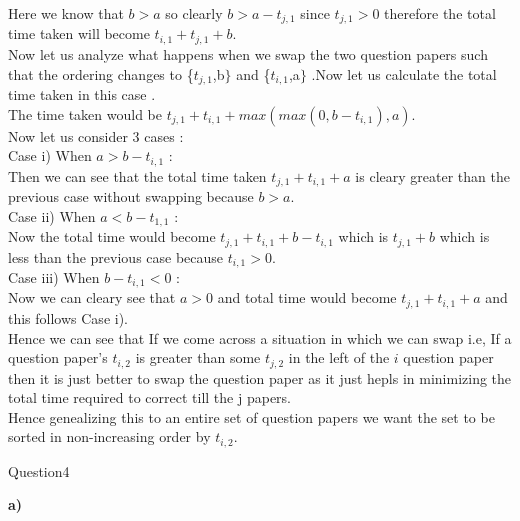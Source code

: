 \documentclass{extarticle}
\theoremstyle{remark}
\newcommand{\tbf}[1]{\textbf{#1}}
\begin{document}
Here we know that $b > a$ so clearly $b > a - t_{j,1}$ since $t_{j,1} > 0$ therefore 
the total time taken will become $t_{i,1} + t_{j,1} + b$.\\

Now let us analyze what happens when we swap the two question papers such that the ordering changes
to \{$t_{j,1}$,b$\}$ and \{$t_{i,1}$,a$\}$ .Now let us calculate the total time taken in this 
case .\\
The time taken would be $t_{j,1} + t_{i,1} + max(max(0,b-t_{i,1}),a)$.\\
Now let us consider 3 cases :\\
Case i) When $a > b-t_{i,1}$ :\\
Then we can see that the total time taken $t_{j,1} + t_{i,1} + a$ is cleary greater than the previous case
without swapping because $b > a$.\\
Case ii) When $a < b-t_{1,1}$ : \\
Now the total time would become $t_{j,1} + t_{i,1} + b - t_{i,1}$ which is $t_{j,1} + b$ which is less than the previous case 
because $t_{i,1} > 0$.\\
Case iii) When $b-t_{i,1} < 0$ : \\
Now we can cleary see that $ a > 0 $ and total time would become $t_{j,1} + t_{i,1} + a$ and 
this follows Case i).\\

Hence we can see that If we come across a situation in which we can swap i.e, If a question
paper's $t_{i,2}$ is greater than some $t_{j,2}$ in the left of the $i$ question paper then it is just better to swap
the question paper as it just hepls in minimizing the total time required to correct till the j papers.\\
Hence genealizing this to an entire set of question papers we want the set to be sorted in 
non-increasing order by $t_{i,2}$.

\newpage
\Large{Question4}\\
\normalsize

\tbf{a)}\\
\end{document}
